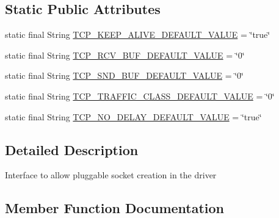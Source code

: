 \subsection*{Static Public Attributes}
\begin{DoxyCompactItemize}
\item 
static final String \mbox{\hyperlink{interfacecom_1_1mysql_1_1cj_1_1protocol_1_1_socket_factory_a1875d288dd7f0366b75714541dae162d}{T\+C\+P\+\_\+\+K\+E\+E\+P\+\_\+\+A\+L\+I\+V\+E\+\_\+\+D\+E\+F\+A\+U\+L\+T\+\_\+\+V\+A\+L\+UE}} = \char`\"{}true\char`\"{}
\item 
static final String \mbox{\hyperlink{interfacecom_1_1mysql_1_1cj_1_1protocol_1_1_socket_factory_a676028cc91743d24b85ff9feba56ebf0}{T\+C\+P\+\_\+\+R\+C\+V\+\_\+\+B\+U\+F\+\_\+\+D\+E\+F\+A\+U\+L\+T\+\_\+\+V\+A\+L\+UE}} = \char`\"{}0\char`\"{}
\item 
static final String \mbox{\hyperlink{interfacecom_1_1mysql_1_1cj_1_1protocol_1_1_socket_factory_a1e431d84057266c2ce6dd98017457b45}{T\+C\+P\+\_\+\+S\+N\+D\+\_\+\+B\+U\+F\+\_\+\+D\+E\+F\+A\+U\+L\+T\+\_\+\+V\+A\+L\+UE}} = \char`\"{}0\char`\"{}
\item 
static final String \mbox{\hyperlink{interfacecom_1_1mysql_1_1cj_1_1protocol_1_1_socket_factory_abc8024d17cc453d316ba98ccccd75975}{T\+C\+P\+\_\+\+T\+R\+A\+F\+F\+I\+C\+\_\+\+C\+L\+A\+S\+S\+\_\+\+D\+E\+F\+A\+U\+L\+T\+\_\+\+V\+A\+L\+UE}} = \char`\"{}0\char`\"{}
\item 
static final String \mbox{\hyperlink{interfacecom_1_1mysql_1_1cj_1_1protocol_1_1_socket_factory_ade8cf2685f0f0388368799db4b8c7167}{T\+C\+P\+\_\+\+N\+O\+\_\+\+D\+E\+L\+A\+Y\+\_\+\+D\+E\+F\+A\+U\+L\+T\+\_\+\+V\+A\+L\+UE}} = \char`\"{}true\char`\"{}
\end{DoxyCompactItemize}


\subsection{Detailed Description}
Interface to allow pluggable socket creation in the driver 

\subsection{Member Function Documentation}
\mbox{\label{interfacecom_1_1mysql_1_1cj_1_1protocol_1_1_socket_factory_acfbef33f9924346f5fbfc476bf0667d9}} 
